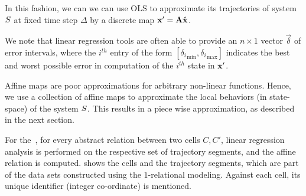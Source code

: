 In this fashion, we can we can use OLS to approximate its trajectories
of system $S$ at fixed time step $\Delta$ by a discrete map $\mathbf{x}'
= \mathbf{A}\hat{\mathbf{x}}$.

We note that linear regression tools are often able to provide an
$n\times 1$ vector $\vec{\delta}$ of error intervals, where the
$i^{th}$ entry of the form $[{\delta_i}_{\min},{\delta_i}_{\max}]$
indicates the best and worst possible error in computation of the
$i^{th}$ state in $\mathbf{x}'$.

Affine maps are poor approximations for arbitrary non-linear
functions. Hence, we use a collection of affine maps to approximate
the local behaviors (in state-space) of the system $S$. This
results in a piece wise approximation, as described in the next
section.

\begin{example}
    For the~, for every abstract relation between two cells
    $C, C'$, linear regression analysis is performed on the respective
    set of trajectory segments, and the affine relation is computed.
     shows the cells and the trajectory segments, which
    are part of the data sets constructed using the $1$-relational
    modeling. Against each cell, its unique identifier (integer
    co-ordinate) is mentioned.
\end{example}
